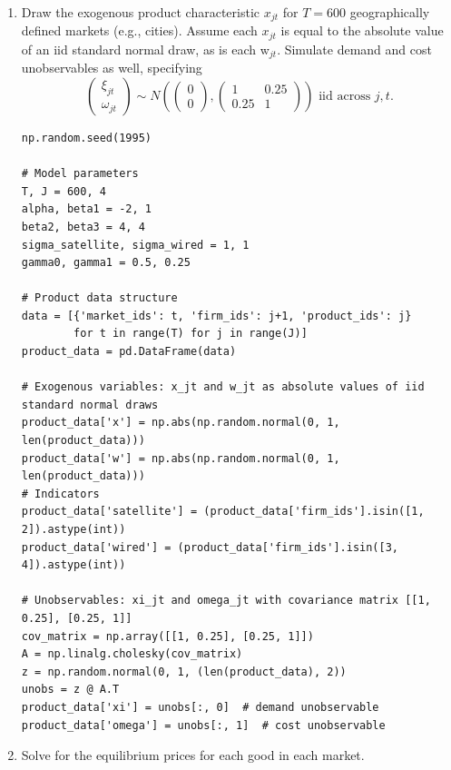 \documentclass[english,11pt]{article}
\begin{document}
\begin{enumerate}
\item Draw the exogenous product characteristic $x_{jt}$ for $T=600$
geographically defined markets (e.g., cities). Assume each $x_{jt}$ is equal
to the absolute value of an iid standard normal draw, as is each w$_{jt}$.
Simulate demand and cost unobservables as well, specifying
\begin{equation*}
\left(
\begin{array}{c}
\xi _{jt} \\
\omega _{jt}%
\end{array}%
\right) \sim N\left( \left(
\begin{array}{c}
0 \\
0%
\end{array}%
\right) ,\left(
\begin{array}{cc}
1 & 0.25 \\
0.25 & 1%
\end{array}%
\right) \right) \text{ iid across }j,t.
\end{equation*}


\begin{verbatim}
np.random.seed(1995)

# Model parameters
T, J = 600, 4
alpha, beta1 = -2, 1
beta2, beta3 = 4, 4  
sigma_satellite, sigma_wired = 1, 1
gamma0, gamma1 = 0.5, 0.25

# Product data structure
data = [{'market_ids': t, 'firm_ids': j+1, 'product_ids': j} 
        for t in range(T) for j in range(J)]
product_data = pd.DataFrame(data)

# Exogenous variables: x_jt and w_jt as absolute values of iid standard normal draws
product_data['x'] = np.abs(np.random.normal(0, 1, len(product_data)))
product_data['w'] = np.abs(np.random.normal(0, 1, len(product_data)))
# Indicators
product_data['satellite'] = (product_data['firm_ids'].isin([1, 2]).astype(int))
product_data['wired'] = (product_data['firm_ids'].isin([3, 4]).astype(int))

# Unobservables: xi_jt and omega_jt with covariance matrix [[1, 0.25], [0.25, 1]]
cov_matrix = np.array([[1, 0.25], [0.25, 1]])
A = np.linalg.cholesky(cov_matrix)
z = np.random.normal(0, 1, (len(product_data), 2))
unobs = z @ A.T
product_data['xi'] = unobs[:, 0]  # demand unobservable
product_data['omega'] = unobs[:, 1]  # cost unobservable
\end{verbatim}

\item Solve for the equilibrium prices for each good in each market.


\end{enumerate}
\end{document}
